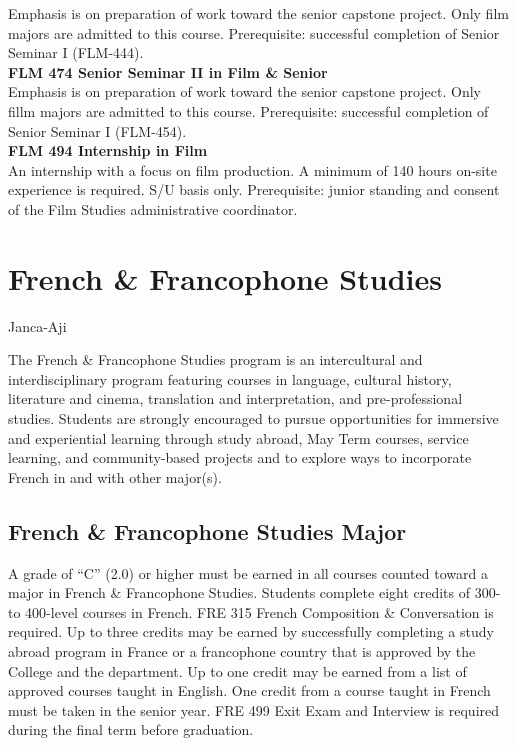 \documentclass[
  letterpaper,
]{scrbook}
\begin{document}
Emphasis is on preparation of work toward the senior capstone project.
Only film majors are admitted to this course. Prerequisite: successful
completion of Senior Seminar I (FLM-444).\\
\textbf{FLM 474 Senior Seminar II in Film \& Senior}\\
Emphasis is on preparation of work toward the senior capstone project.
Only fillm majors are admitted to this course. Prerequisite: successful
completion of Senior Seminar I (FLM-454).\\
\textbf{FLM 494 Internship in Film}\\
An internship with a focus on film production. A minimum of 140 hours
on-site experience is required. S/U basis only. Prerequisite: junior
standing and consent of the Film Studies administrative coordinator.

\section{French \& Francophone
Studies}\label{sec-french-and-francophone-studies}

Janca-Aji

The French \& Francophone Studies program is an intercultural and
interdisciplinary program featuring courses in language, cultural
history, literature and cinema, translation and interpretation, and
pre-professional studies. Students are strongly encouraged to pursue
opportunities for immersive and experiential learning through study
abroad, May Term courses, service learning, and community-based projects
and to explore ways to incorporate French in and with other major(s).

\subsection{French \& Francophone Studies
Major}\label{french-francophone-studies-major}

A grade of ``C'' (2.0) or higher must be earned in all courses counted
toward a major in French \& Francophone Studies. Students complete eight
credits of 300- to 400-level courses in French. FRE 315 French
Composition \& Conversation is required. Up to three credits may be
earned by successfully completing a study abroad program in France or a
francophone country that is approved by the College and the department.
Up to one credit may be earned from a list of approved courses taught in
English. One credit from a course taught in French must be taken in the
senior year. FRE 499 Exit Exam and Interview is required during the
final term before graduation.
\end{document}
